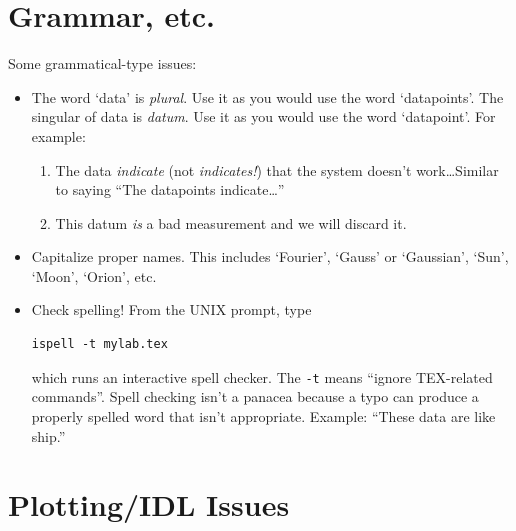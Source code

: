 \documentclass[11pt,preprint]{aastex}
\begin{document}
\section{ Grammar, etc.}

	Some grammatical-type issues: \begin{itemize}

	\item The word `data' is {\it plural}. Use it as you would use
the word `datapoints'. The singular of data is {\it datum}. Use it as
you would use the word `datapoint'. For example: \begin{enumerate}

	\item The data {\it indicate} (not {\it indicates!}) that the
system doesn't work\dots Similar to saying ``The datapoints
indicate\dots''

	\item This datum {\it is} a bad measurement and we will discard
it.  
\end{enumerate}

	\item Capitalize proper names. This includes `Fourier', `Gauss'
or `Gaussian', `Sun', `Moon', `Orion', etc.

	\item Check spelling! From the UNIX prompt, type

\begin{verbatim}
ispell -t mylab.tex
\end{verbatim}

\noindent which runs an interactive spell checker. The \verb$-t$ means
``ignore TEX-related commands''. Spell checking isn't a panacea because a
typo can produce a properly spelled word that isn't appropriate.
Example: ``These data are like ship.''

\end{itemize}

\section{ Plotting/IDL Issues} \label{plotting}
\end{document}
